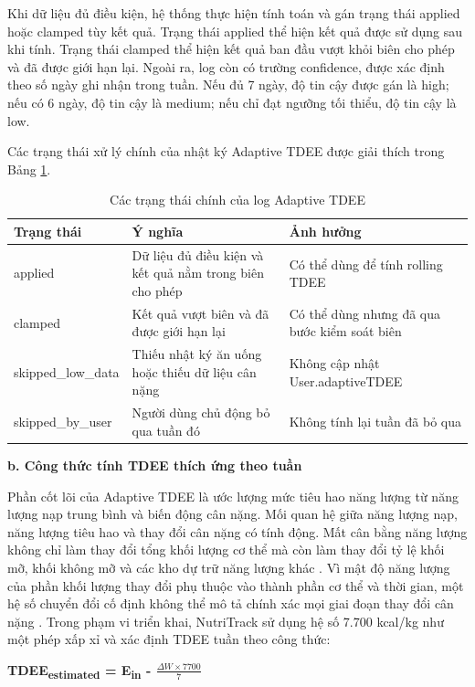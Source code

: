 \documentclass[12pt, a4paper]{report}
\begin{document}
Khi dữ liệu đủ điều kiện, hệ thống thực hiện tính toán và gán trạng thái applied hoặc clamped tùy kết quả. Trạng thái applied thể hiện kết quả được sử dụng sau khi tính. Trạng thái clamped thể hiện kết quả ban đầu vượt khỏi biên cho phép và đã được giới hạn lại. Ngoài ra, log còn có trường confidence, được xác định theo số ngày ghi nhận trong tuần. Nếu đủ 7 ngày, độ tin cậy được gán là high; nếu có 6 ngày, độ tin cậy là medium; nếu chỉ đạt ngưỡng tối thiểu, độ tin cậy là low.

Các trạng thái xử lý chính của nhật ký Adaptive TDEE được giải thích trong Bảng \ref{tab:adaptive_tdee_status}.
\begin{longtable}{|>{\raggedright\arraybackslash}p{4cm}|>{\raggedright\arraybackslash}p{4cm}|p{7cm}|}
\caption{Các trạng thái chính của log Adaptive TDEE}
\label{tab:adaptive_tdee_status} \\
\hline
\textbf{Trạng thái} & \textbf{Ý nghĩa} & \textbf{Ảnh hưởng} \\
\hline
applied & Dữ liệu đủ điều kiện và kết quả nằm trong biên cho phép & Có thể dùng để tính rolling TDEE \\
\hline
clamped & Kết quả vượt biên và đã được giới hạn lại & Có thể dùng nhưng đã qua bước kiểm soát biên \\
\hline
skipped\_low\_data & Thiếu nhật ký ăn uống hoặc thiếu dữ liệu cân nặng & Không cập nhật User.adaptiveTDEE \\
\hline
skipped\_by\_user & Người dùng chủ động bỏ qua tuần đó & Không tính lại tuần đã bỏ qua \\
\hline
\end{longtable}

\textbf{b. Công thức tính TDEE thích ứng theo tuần}

Phần cốt lõi của Adaptive TDEE là ước lượng mức tiêu hao năng lượng từ năng lượng nạp trung bình và biến động cân nặng. Mối quan hệ giữa năng lượng nạp, năng lượng tiêu hao và thay đổi cân nặng có tính động. Mất cân bằng năng lượng không chỉ làm thay đổi tổng khối lượng cơ thể mà còn làm thay đổi tỷ lệ khối mỡ, khối không mỡ và các kho dự trữ năng lượng khác \cite{chow_hall_2008}. Vì mật độ năng lượng của phần khối lượng thay đổi phụ thuộc vào thành phần cơ thể và thời gian, một hệ số chuyển đổi cố định không thể mô tả chính xác mọi giai đoạn thay đổi cân nặng \cite{chow_hall_2008}. Trong phạm vi triển khai, NutriTrack sử dụng hệ số 7.700 kcal/kg như một phép xấp xỉ và xác định TDEE tuần theo công thức:

\textbf{TDEE\textsubscript{estimated} = E\textsubscript{in} - $\frac{\Delta W \times 7700}{7}$}
\end{document}
